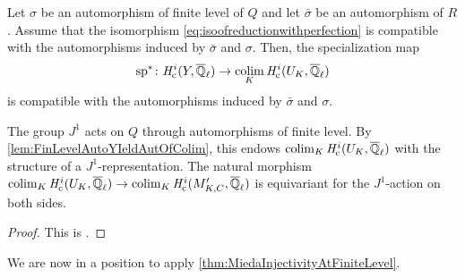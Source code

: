 \documentclass[../main.tex]{subfiles}
\begin{document}
\begin{prop}\label{prop:SpecMapIsEquivariantWithFinLev}
  Let $\sigma$ be an automorphism of finite level of $Q$ and let 
  $\bar \sigma$ be an automorphism of $R$. Assume that the isomorphism
  \eqref{eq:isoofreductionwithperfection} is compatible with the automorphisms
  induced by $\bar \sigma$ and $\sigma$. Then, the specialization map
  \begin{equation*}
    \mathrm{sp}^* \colon \mathit H_{\mathrm{c}}^i(Y, {\overline {\mathbb{Q}}_\ell}) \to \operatorname*{colim}_K \mathit H_{\mathrm{c}}^i(U_K, {\overline {\mathbb{Q}}_\ell})
  \end{equation*}
  is compatible with the automorphisms induced by $\bar \sigma$ and 
  $\sigma$. 
\end{prop}

\begin{prop}\label{prop:ActinOfJ1IsFinLevel}
  The group $J^1$ acts on $Q$ through automorphisms of finite level. 
  By \cref{lem:FinLevelAutoYIeldAutOfColim}, this endows $\operatorname*{colim}_K \mathit H_{\mathrm{c}}^i(U_K, {\overline {\mathbb{Q}}_\ell})$
  with the structure of a $J^1$-representation. The natural morphism $\operatorname*{colim}_K
  \mathit H_{\mathrm{c}}^i(U_K, {\overline {\mathbb{Q}}_\ell}) \to \operatorname*{colim}_K \mathit H_{\mathrm{c}}^i(M'_{K,C}, {\overline {\mathbb{Q}}_\ell})$ is equivariant
  for the $J^1$-action on both sides.
\begin{proof}
  This is \cite[Propsition 4.5]{mieda2016geometric}.
\end{proof}
\end{prop}

We are now in a position to apply \cref{thm:MiedaInjectivityAtFiniteLevel}.
\end{document}
